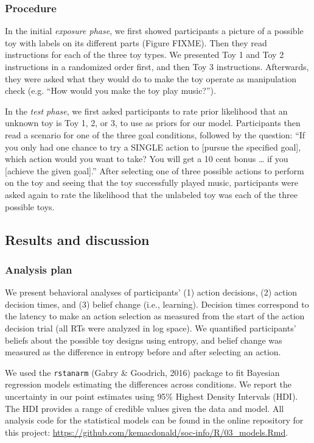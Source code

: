 \documentclass[10pt, letterpaper]{article}
\begin{document}
\subsubsection{Procedure}\label{procedure}

In the initial \emph{exposure phase}, we first showed participants a
picture of a possible toy with labels on its different parts (Figure
FIXME). Then they read instructions for each of the three toy types. We
presented Toy 1 and Toy 2 instructions in a randomized order first, and
then Toy 3 instructions. Afterwards, they were asked what they would do
to make the toy operate as manipulation check (e.g. ``How would you make
the toy play music?'').

In the \emph{test phase}, we first asked participants to rate prior
likelihood that an unknown toy is Toy 1, 2, or 3, to use as priors for
our model. Participants then read a scenario for one of the three goal
conditions, followed by the question: ``If you only had one chance to
try a SINGLE action to {[}pursue the specified goal{]}, which action
would you want to take? You will get a 10 cent bonus \ldots{} if you
{[}achieve the given goal{]}.'' After selecting one of three possible
actions to perform on the toy and seeing that the toy successfully
played music, participants were asked again to rate the likelihood that
the unlabeled toy was each of the three possible toys.

\subsection{Results and discussion}\label{results-and-discussion}

\subsubsection{Analysis plan}\label{analysis-plan}

We present behavioral analyses of participants' (1) action decisions,
(2) action decision times, and (3) belief change (i.e., learning).
Decision times correspond to the latency to make an action selection as
measured from the start of the action decision trial (all RTs were
analyzed in log space). We quantified participants' beliefs about the
possible toy designs using entropy, and belief change was measured as
the difference in entropy before and after selecting an action.

We used the \texttt{rstanarm} (Gabry \& Goodrich, 2016) package to fit
Bayesian regression models estimating the differences across conditions.
We report the uncertainty in our point estimates using 95\% Highest
Density Intervals (HDI). The HDI provides a range of credible values
given the data and model. All analysis code for the statistical models
can be found in the online repository for this project:
\url{https://github.com/kemacdonald/soc-info/R/03_models.Rmd}.
\end{document}
